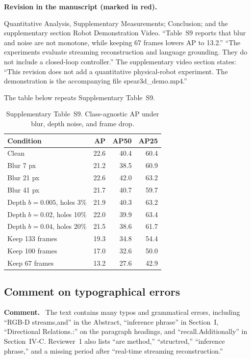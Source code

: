 \documentclass[11pt]{article}
\newcommand{\revcomment}[1]{%
  \par\vspace{0.6em}\noindent\textcolor{revblue}{\textbf{Comment.}}\ %
  \textcolor{revblue}{#1}\par\vspace{0.4em}}
\newcommand{\revchange}[1]{%
  \par\noindent\textbf{Revision in the manuscript (marked in red).}\par
  \noindent\textcolor{revred}{#1}\par\vspace{0.8em}}
\begin{document}
\revchange{Quantitative Analysis, Supplementary Measurements; Conclusion; and the supplementary section Robot Demonstration Video. ``Table~S9 reports that blur and noise are not monotone, while keeping 67 frames lowers AP to 13.2.'' ``The experiments evaluate streaming reconstruction and language grounding. They do not include a closed-loop controller.'' The supplementary video section states: ``This revision does not add a quantitative physical-robot experiment. The demonstration is the accompanying file spear3d\_demo.mp4.''}

\noindent The table below repeats Supplementary Table~S9.

\begin{table}[ht]
\centering
\caption{Supplementary Table~S9. Class-agnostic AP under blur, depth noise, and frame drop.}
\label{tab:robust}
\small
\begin{tabular}{lrrr}
\toprule
Condition & AP & AP50 & AP25 \\
\midrule
Clean & 22.6 & 40.4 & 60.4 \\
Blur 7 px & 21.2 & 38.5 & 60.9 \\
Blur 21 px & 22.6 & 42.0 & 63.2 \\
Blur 41 px & 21.7 & 40.7 & 59.7 \\
Depth \(b{=}0.005\), holes 3\% & 21.9 & 40.3 & 63.2 \\
Depth \(b{=}0.02\), holes 10\% & 22.0 & 39.9 & 63.4 \\
Depth \(b{=}0.04\), holes 20\% & 21.5 & 38.6 & 61.7 \\
Keep 133 frames & 19.3 & 34.8 & 54.4 \\
Keep 100 frames & 17.0 & 32.6 & 50.0 \\
Keep 67 frames & 13.2 & 27.6 & 42.9 \\
\bottomrule
\end{tabular}
\end{table}

\subsection*{Comment on typographical errors}

\revcomment{The text contains many typos and grammatical errors, including ``RGB-D streams,and'' in the Abstract, ``inference phrase'' in Section~I, ``Directional Relations.:'' on the paragraph headings, and ``recall.Additionally'' in Section~IV-C. Reviewer~1 also lists ``are method,'' ``structred,'' ``inference phrase,'' and a missing period after ``real-time streaming reconstruction.''}
\end{document}
